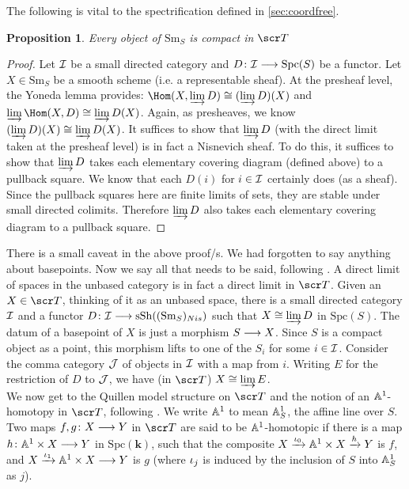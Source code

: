\documentclass{amsart}
\newtheorem{prop}{Proposition}[section]
\theoremstyle{definition}
\newcommand{\bk}{\mathbf{k}}
\begin{document}
The following is vital to the spectrification defined in \ref{sec:coordfree}.

\begin{prop}\label{prop:1.2}
Every object of $\mathrm{Sm}_S$ is compact in $\sT$
\end{prop}
\begin{proof}
Let ${\mathcal{I}}$ be a small directed category and $D \colon {\mathcal{I}} \longrightarrow \mathrm{Spc}(S)$ be a functor. Let $X \in \mathrm{Sm}_S$ be a smooth scheme (i.e. a representable sheaf). At the presheaf level, the Yoneda lemma provides: $\Hom(X, \varinjlim D) \iso (\varinjlim D)(X)$ and $\varinjlim \Hom(X, D) \iso \varinjlim D(X)$. Again, as presheaves, we know $(\varinjlim D)(X) \cong \varinjlim D(X)$. It suffices to show that $\varinjlim D$ (with the direct limit taken at the presheaf level) is in fact a Nisnevich sheaf. To do this, it suffices to show that $\varinjlim D$ takes each elementary covering diagram (defined above) to a pullback square. We know that each $D(i)$ for $i \in {\mathcal{I}}$ certainly does (as a sheaf). Since the pullback squares here are finite limits of sets, they are stable under small directed colimits. Therefore $\varinjlim D$ also takes each elementary covering diagram to a pullback square.
\end{proof}

There is a small caveat in the above proof/s. We had forgotten to say anything about basepoints. Now we say all that needs to be said, following \cite{Hu03}. A direct limit of spaces in the unbased category is in fact a direct limit in $\sT$. Given an $X \in \sT$, thinking of it as an unbased space, there is a small directed category ${\mathcal{I}}$ and a functor $D \colon {\mathcal{I}} \longrightarrow \mathrm{sSh}((\mathrm{Sm}_S)_{Nis})$ such that $X \cong \varinjlim D$ in $\mathrm{Spc}(S)$. The datum of a basepoint of $X$ is just a morphism $S \longrightarrow X$. Since $S$ is a compact object as a point, this morphism lifts to one of the $S_i$ for some $i \in {\mathcal{I}}$. Consider the comma category ${\mathcal{J}}$ of objects in ${\mathcal{I}}$ with a map from $i$. Writing $E$ for the restriction of $D$ to ${\mathcal{J}}$, we have (in $\sT$) $X \cong \varinjlim E$.\\

We now get to the Quillen model structure on $\sT$ and the notion of an $\mathbb{A}^1$-homotopy in $\sT$, following \cite{MV99}. We write $\mathbb{A}^1$ to mean $\mathbb{A}^1_S$, the affine line over $S$. Two maps $f, g \colon X \longrightarrow Y$ in $\sT$ are said to be $\mathbb{A}^1$-homotopic if there is a map $h \colon \mathbb{A}^1 \times X \longrightarrow Y$ in $\mathrm{Spc}(\bk)$, such that the composite $X \xrightarrow{\iota_0} \mathbb{A}^1 \times X \xrightarrow{h} Y$ is $f$, and $X \xrightarrow{\iota_1} \mathbb{A}^1 \times X \longrightarrow Y$ is $g$ (where $\iota_j$ is induced by the inclusion of $S$ into $\mathbb{A}^1_S$ as $j$). 
\end{document}
